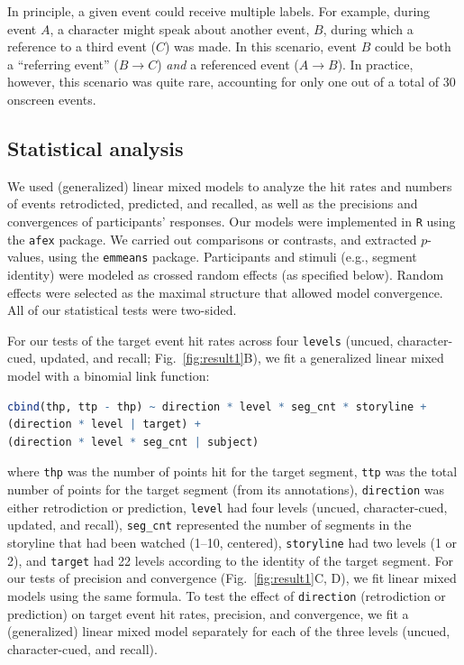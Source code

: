 \documentclass[10pt]{article}
\begin{document}
In principle, a given event could receive multiple labels.  For example, during event $A$, a character might speak about another event, $B$, during which a reference to a third event ($C$) was made.  In this scenario, event $B$ could be both a ``referring event'' ($B \rightarrow C$) \textit{and} a referenced event ($A \rightarrow B$).  In practice, however, this scenario was quite rare, accounting for only one out of a total of 30 onscreen events.

\subsection*{Statistical analysis}
We used (generalized) linear mixed models to analyze the hit rates and numbers of events retrodicted, predicted, and recalled, as well as the precisions and convergences of participants' responses.  Our models were implemented in \texttt{R} using the \texttt{afex} package.  We carried out comparisons or contrasts, and extracted $p$-values, using the \texttt{emmeans} package.  Participants and stimuli (e.g., segment identity) were modeled as crossed random effects (as specified below).  Random effects were selected as the maximal structure that allowed model convergence. All of our statistical tests were two-sided.

For our tests of the target event hit rates across four \texttt{levels} (uncued, character-cued, updated, and recall; Fig.~\ref{fig:result1}B), we fit a generalized linear mixed model with a binomial link function:
\begin{lstlisting}[language=R]
  cbind(thp, ttp - thp) ~ direction * level * seg_cnt * storyline +
(direction * level | target) +
(direction * level * seg_cnt | subject)
\end{lstlisting}
where \texttt{thp} was the number of points hit for the target segment, \texttt{ttp} was the total number of points for the target segment (from its annotations), \texttt{direction} was either retrodiction or prediction, \texttt{level} had four levels (uncued, character-cued, updated, and recall), \texttt{seg\_cnt} represented the number of segments in the storyline that had been watched (1--10, centered),  \texttt{storyline} had two levels (1 or 2), and \texttt{target} had 22 levels according to the identity of the target segment.  For our tests of precision and convergence (Fig.~\ref{fig:result1}C, D), we fit linear mixed models using the same formula.  To test the effect of \texttt{direction} (retrodiction or prediction) on target event hit rates, precision, and convergence, we fit a (generalized) linear mixed model separately for each of the three levels (uncued, character-cued, and recall).  
\end{document}

